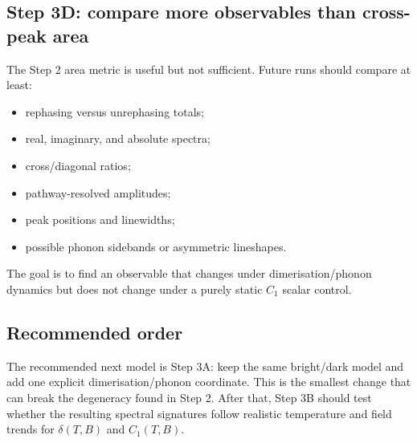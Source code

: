 \documentclass[11pt]{article}
\begin{document}
\subsection{Step 3D: compare more observables than cross-peak area}
The Step 2 area metric is useful but not sufficient.  Future runs should compare
at least:
\begin{itemize}
\item rephasing versus unrephasing totals;
\item real, imaginary, and absolute spectra;
\item cross/diagonal ratios;
\item pathway-resolved amplitudes;
\item peak positions and linewidths;
\item possible phonon sidebands or asymmetric lineshapes.
\end{itemize}
The goal is to find an observable that changes under dimerisation/phonon
dynamics but does not change under a purely static $C_1$ scalar control.

\subsection{Recommended order}
The recommended next model is Step 3A: keep the same bright/dark model and add
one explicit dimerisation/phonon coordinate.  This is the smallest change that
can break the degeneracy found in Step 2.  After that, Step 3B should test
whether the resulting spectral signatures follow realistic temperature and
field trends for $\delta(T,B)$ and $C_1(T,B)$.
\end{document}
